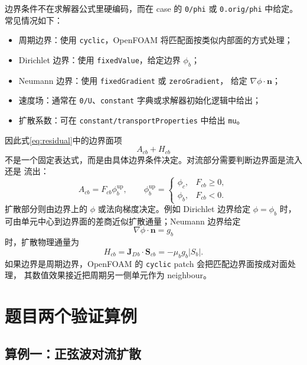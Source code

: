 \documentclass[UTF8,12pt,a4paper]{ctexart}
\numberwithin{equation}{section}
\newcommand{\Sf}{\bm S}
\newcommand{\Jd}{\bm J_D}
\begin{document}
边界条件不在求解器公式里硬编码，而在 case 的 \texttt{0/phi} 或
\texttt{0.orig/phi} 中给定。常见情况如下：
\begin{itemize}
  \item 周期边界：使用 \texttt{cyclic}，OpenFOAM 将匹配面按类似内部面的方式处理；
  \item Dirichlet 边界：使用 \texttt{fixedValue}，给定边界 $\phi_b$；
  \item Neumann 边界：使用 \texttt{fixedGradient} 或 \texttt{zeroGradient}，
        给定 $\nabla\phi\cdot\bm n$；
  \item 速度场：通常在 \texttt{0/U}、\texttt{constant} 字典或求解器初始化逻辑中给出；
  \item 扩散系数：可在 \texttt{constant/transportProperties} 中给出 \texttt{mu}。
\end{itemize}

因此式\eqref{eq:residual}中的边界面项
\begin{equation}
  A_{cb}+H_{cb}
  \label{eq:boundary_flux_sum}
\end{equation}
不是一个固定表达式，而是由具体边界条件决定。对流部分需要判断边界面是流入还是
流出：
\begin{equation}
  A_{cb}=F_{cb}\phi_{b}^{\mathrm{up}},
  \qquad
  \phi_b^{\mathrm{up}}
  =
  \begin{cases}
    \phi_c,&F_{cb}\ge 0,\\
    \phi_b,&F_{cb}<0.
  \end{cases}
  \label{eq:boundary_advective_flux}
\end{equation}
扩散部分则由边界上的 $\phi$ 或法向梯度决定。例如 Dirichlet 边界给定
$\phi=\phi_b$ 时，可由单元中心到边界面的差商近似扩散通量；Neumann 边界给定
\begin{equation}
  \nabla\phi\cdot\bm n=g_b
  \label{eq:boundary_neumann}
\end{equation}
时，扩散物理通量为
\begin{equation}
  H_{cb}
  =
  \Jd{}_{b}\cdot\Sf_{cb}
  =
  -\mu_b g_b |S_b|.
  \label{eq:boundary_diffusive_flux}
\end{equation}
如果边界是周期边界，OpenFOAM 的 \texttt{cyclic} patch 会把匹配边界面按成对面处理，
其数值效果接近把周期另一侧单元作为 neighbour。

\section{题目两个验证算例}

\subsection{算例一：正弦波对流扩散}
\end{document}
